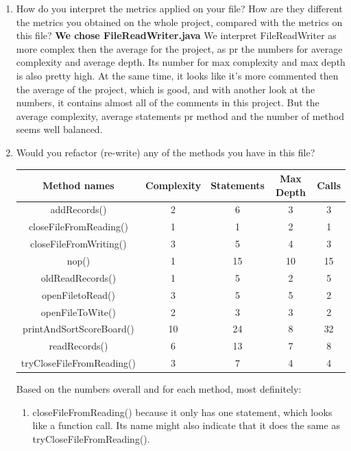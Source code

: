 \documentclass{article}
\begin{document}
\begin{enumerate}
\item
How do you interpret the metrics applied on your file? How are they different the metrics you
obtained on the whole project, compared with the metrics on this file?\newline
\textbf{We chose FileReadWriter.java}\newline
We interpret FileReadWriter as more complex then the average for the project, as pr the 
numbers for average complexity and average depth. Its number for max complexity and
max depth is also pretty high. At the same time, it looks like it's more commented then
the average of the project, which is good, and with another look at the numbers, it contains 
almost all of the comments in this project. But the average complexity, average statements
pr method and the number of method seems well balanced.



\item
Would	you	refactor	(re-write)	any	of	the	methods you	have	in	this	file?	

\begin{tabulary}{0.5\textwidth}{| c | c | c | c | c |}
\hline
\textbf{Method names} &	\textbf{Complexity} & \textbf{Statements}
 & \textbf{Max Depth} & \textbf{Calls} \\ \hline

addRecords()				& 2 & 6 & 3 & 3 \\ \hline
closeFileFromReading() 		& 1 & 1 & 2 & 1 \\ \hline
closeFileFromWriting() 		& 3 & 5 & 4 & 3 \\ \hline
nop() 				  		& 1 & 15 & 10 & 15 \\ \hline
oldReadRecords()		  	& 1 & 5 & 2 & 5 \\ \hline
openFiletoRead()			& 3 & 5 & 5 & 2 \\ \hline
openFileToWite()			& 2 & 3 & 3 & 2 \\ \hline
printAndSortScoreBoard()	& 10 & 24 & 8 & 32 \\ \hline
readRecords()				& 6 & 13 & 7 & 8 \\ \hline
tryCloseFileFromReading()	& 3 & 7 & 4 & 4 \\ \hline
\end{tabulary}

Based on the numbers overall and for each method, most definitely:
\begin{enumerate}
\item
closeFileFromReading() because it only has one statement, which looks like a function call.
Its name might also indicate that it does the same as tryCloseFileFromReading().


\end{enumerate}
\end{enumerate}
\end{document}
